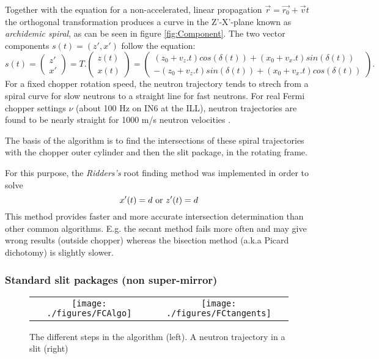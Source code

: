 Together with the equation for a non-accelerated, linear propagation $\vec{r} = \vec{r_0}+\vec{v}t$ the orthogonal transformation produces a curve in the Z'-X'-plane known as \emph{archidemic spiral}, as can be seen in figure \ref{fig:Component}. The two vector components $s(t) = (z',x')$ follow the equation:
\begin{equation}
s(t) = \left(
\begin{array}{c}
z' \\
x'
\end{array}
\right) = T.\left(
\begin{array}{c}
z(t) \\
x(t)
\end{array}
\right) = \left(
\begin{array}{c}
(z_0+v_z.t)cos(\delta(t)) + (x_0+v_x.t)sin(\delta(t)) \\
-(z_0+v_z.t)sin(\delta(t)) + (x_0+v_x.t)cos(\delta(t))
\end{array}
\right).
\label{eq:Txz}
\end{equation}
For a fixed chopper rotation speed, the neutron trajectory tends to strech from a spiral curve for slow neutrons to a straight line for fast neutrons. For real Fermi chopper settings $\nu$ (about 100 Hz on IN6 at the ILL), neutron trajectories are found to be nearly straight for 1000 m/s neutron velocities \cite{blanc83}.

The basis of the algorithm is to find the intersections of these spiral trajectories with the chopper outer cylinder and then the slit package, in the rotating frame.

For this purpose, the \emph{Ridders's} root finding method was implemented \cite{NumRecip} in order to solve
\begin{equation}
x'(t) = d {\rm\ or\ } z'(t) = d
\label{eq:Ridder}
\end{equation}
This method provides faster and more accurate intersection determination than other common algorithms. E.g. the secant method fails more often and may give wrong results (outside chopper) whereas the bisection method (a.k.a Picard dichotomy) is slightly slower.

\subsubsection{Standard slit packages (non super-mirror)}

\begin{figure}
\begin{center}
\begin{tabular}{cc}
\texttt{[image: ./figures/FCAlgo]}
&
\texttt{[image: ./figures/FCtangents]}
\end{tabular}
\end{center}
\caption{The different steps in the algorithm (left). A neutron trajectory in a slit (right)}
\label{fig:TOFalg}
\end{figure}


